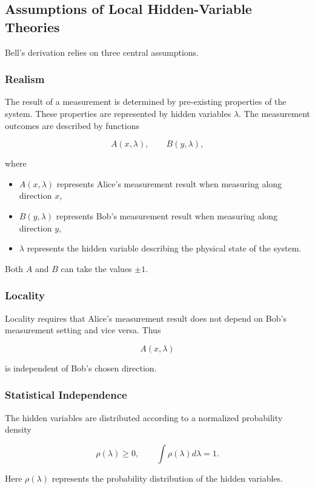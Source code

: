 \documentclass[14pt,a4paper]{extarticle}
\begin{document}
\subsection{Assumptions of Local Hidden-Variable Theories}

Bell’s derivation relies on three central assumptions.

\subsubsection{Realism}

The result of a measurement is determined by pre-existing properties of the system. These properties are represented by hidden variables $\lambda$. The measurement outcomes are described by functions

\[
A(x,\lambda), \qquad B(y,\lambda),
\]

where

\begin{itemize}
\item $A(x,\lambda)$ represents Alice's measurement result when measuring along direction $x$,
\item $B(y,\lambda)$ represents Bob's measurement result when measuring along direction $y$,
\item $\lambda$ represents the hidden variable describing the physical state of the system.
\end{itemize}

Both $A$ and $B$ can take the values $\pm1$.

\subsubsection{Locality}

Locality requires that Alice’s measurement result does not depend on Bob’s measurement setting and vice versa. Thus

\[
A(x,\lambda)
\]

is independent of Bob’s chosen direction.

\subsubsection{Statistical Independence}

The hidden variables are distributed according to a normalized probability density

\[
\rho(\lambda) \ge 0,
\qquad
\int \rho(\lambda) d\lambda = 1.
\]

Here $\rho(\lambda)$ represents the probability distribution of the hidden variables.
\end{document}
